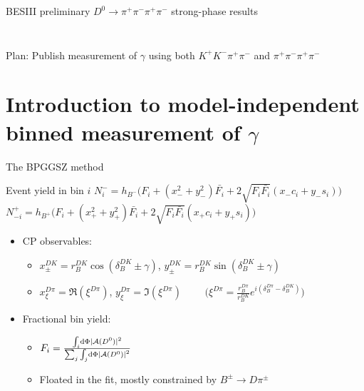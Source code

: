 \documentclass{beamer}
\begin{document}
\begin{frame}{BESIII preliminary $D^0\to\pi^+\pi^-\pi^+\pi^-$ strong-phase results}
\begin{columns}
\begin{column}{0.50\textwidth}
\begin{figure}
      \end{figure}
    \end{column}
  \end{columns}
  \begin{center}
    Plan: Publish measurement of $\gamma$ using both $K^+K^-\pi^+\pi^-$ and $\pi^+\pi^-\pi^+\pi^-$
  \end{center}
\end{frame}

\section{Introduction to model-independent binned measurement of \texorpdfstring{$\gamma$}{gamma}}
\begin{frame}{The BPGGSZ method}
  \begin{center}
    \begin{minipage}{0.6\textwidth}
      \begin{block}{Event yield in bin $i$}
        \footnotesize
        $N^-_i = h_{B^-}\big(F_i + (x_-^2 + y_-^2)\bar{F_i} + 2\sqrt{F_i\bar{F_i}}(x_-c_i + y_-s_i)\big)$ \\
        $N^+_{-i} = h_{B^+}\big(F_i + (x_+^2 + y_+^2)\bar{F_i} + 2\sqrt{F_i\bar{F_i}}(x_+c_i + y_+s_i)\big)$
      \end{block}
    \end{minipage}
  \end{center}
  \begin{itemize}
    \item{CP observables:}
    \begin{itemize}
      \item{$x_\pm^{DK} = r_B^{DK}\cos(\delta_B^{DK}\pm\gamma)$, \quad $y_\pm^{DK} = r_B^{DK}\sin(\delta_B^{DK}\pm\gamma)$}
      \item{$x_\xi^{D\pi} = \Re(\xi^{D\pi})$, $y_\xi^{D\pi} = \Im(\xi^{D\pi})$ $\quad\quad\Big(\xi^{D\pi} = \frac{r_B^{D\pi}}{r_B^{DK}}e^{i(\delta_B^{D\pi} - \delta_B^{DK})}\Big)$}
    \end{itemize}
    \item{Fractional bin yield:}
    \begin{itemize}
      \item{$F_i = \frac{\int_i\dd{\Phi}|\mathcal{A}(D^0)|^2}{\sum_j\int_j\dd{\Phi}\abs{\mathcal{A}(D^0)}^2}$}
      \item{Floated in the fit, mostly constrained by $B^\pm\to D\pi^\pm$}
    \end{itemize}
  \end{itemize}

\end{frame}
\end{document}

